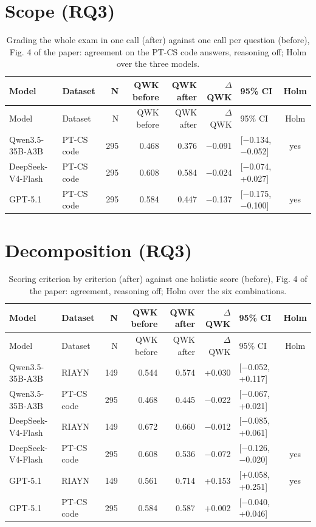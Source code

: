\documentclass[10pt]{article}
\begin{document}
\section{Scope (RQ3)}
\begingroup\footnotesize
\begin{longtable}{llrrrrlc}
\caption{Grading the whole exam in one call (after) against one call per question (before), Fig. 4 of the paper: agreement on the PT-CS code answers, reasoning off; Holm over the three models.}\\
\hline
Model & Dataset & N & QWK before & QWK after & $\Delta$QWK & 95\% CI & Holm \\ \hline
\endfirsthead
\hline
Model & Dataset & N & QWK before & QWK after & $\Delta$QWK & 95\% CI & Holm \\ \hline
\endhead
Qwen3.5-35B-A3B & PT-CS code & 295 & 0.468 & 0.376 & $-$0.091 & [$-$0.134, $-$0.052] & yes \\
DeepSeek-V4-Flash & PT-CS code & 295 & 0.608 & 0.584 & $-$0.024 & [$-$0.074, +0.027] &  \\
GPT-5.1 & PT-CS code & 295 & 0.584 & 0.447 & $-$0.137 & [$-$0.175, $-$0.100] & yes \\
\hline
\end{longtable}
\endgroup

\section{Decomposition (RQ3)}
\begingroup\footnotesize
\begin{longtable}{llrrrrlc}
\caption{Scoring criterion by criterion (after) against one holistic score (before), Fig. 4 of the paper: agreement, reasoning off; Holm over the six combinations.}\\
\hline
Model & Dataset & N & QWK before & QWK after & $\Delta$QWK & 95\% CI & Holm \\ \hline
\endfirsthead
\hline
Model & Dataset & N & QWK before & QWK after & $\Delta$QWK & 95\% CI & Holm \\ \hline
\endhead
Qwen3.5-35B-A3B & RIAYN & 149 & 0.544 & 0.574 & +0.030 & [$-$0.052, +0.117] &  \\
Qwen3.5-35B-A3B & PT-CS code & 295 & 0.468 & 0.445 & $-$0.022 & [$-$0.067, +0.021] &  \\
DeepSeek-V4-Flash & RIAYN & 149 & 0.672 & 0.660 & $-$0.012 & [$-$0.085, +0.061] &  \\
DeepSeek-V4-Flash & PT-CS code & 295 & 0.608 & 0.536 & $-$0.072 & [$-$0.126, $-$0.020] & yes \\
GPT-5.1 & RIAYN & 149 & 0.561 & 0.714 & +0.153 & [+0.058, +0.251] & yes \\
GPT-5.1 & PT-CS code & 295 & 0.584 & 0.587 & +0.002 & [$-$0.040, +0.046] &  \\
\hline
\end{longtable}
\endgroup
\end{document}
